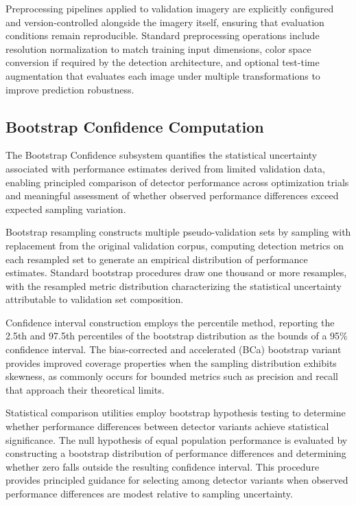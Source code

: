 Preprocessing pipelines applied to validation imagery are explicitly configured and version-controlled alongside the imagery itself, ensuring that evaluation conditions remain reproducible. Standard preprocessing operations include resolution normalization to match training input dimensions, color space conversion if required by the detection architecture, and optional test-time augmentation that evaluates each image under multiple transformations to improve prediction robustness.

\subsection{Bootstrap Confidence Computation}

The Bootstrap Confidence subsystem quantifies the statistical uncertainty associated with performance estimates derived from limited validation data, enabling principled comparison of detector performance across optimization trials and meaningful assessment of whether observed performance differences exceed expected sampling variation.

Bootstrap resampling constructs multiple pseudo-validation sets by sampling with replacement from the original validation corpus, computing detection metrics on each resampled set to generate an empirical distribution of performance estimates. Standard bootstrap procedures draw one thousand or more resamples, with the resampled metric distribution characterizing the statistical uncertainty attributable to validation set composition.

Confidence interval construction employs the percentile method, reporting the 2.5th and 97.5th percentiles of the bootstrap distribution as the bounds of a 95\% confidence interval. The bias-corrected and accelerated (BCa) bootstrap variant provides improved coverage properties when the sampling distribution exhibits skewness, as commonly occurs for bounded metrics such as precision and recall that approach their theoretical limits.

Statistical comparison utilities employ bootstrap hypothesis testing to determine whether performance differences between detector variants achieve statistical significance. The null hypothesis of equal population performance is evaluated by constructing a bootstrap distribution of performance differences and determining whether zero falls outside the resulting confidence interval. This procedure provides principled guidance for selecting among detector variants when observed performance differences are modest relative to sampling uncertainty.

